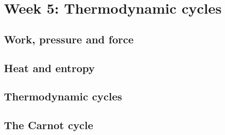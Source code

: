 \renewcommand{\thisweek}{MATH327 Week 5}
\renewcommand{\moddate}{Last modified 3 Feb.~2021}
\setcounter{section}{5}
\setcounter{subsection}{0}
{}
\section*{Week 5: Thermodynamic cycles}

\subsection{Work, pressure and force}



\newpage %
\subsection{Heat and entropy}



\newpage %
\subsection{Thermodynamic cycles}



\newpage %
\subsection{The Carnot cycle}
